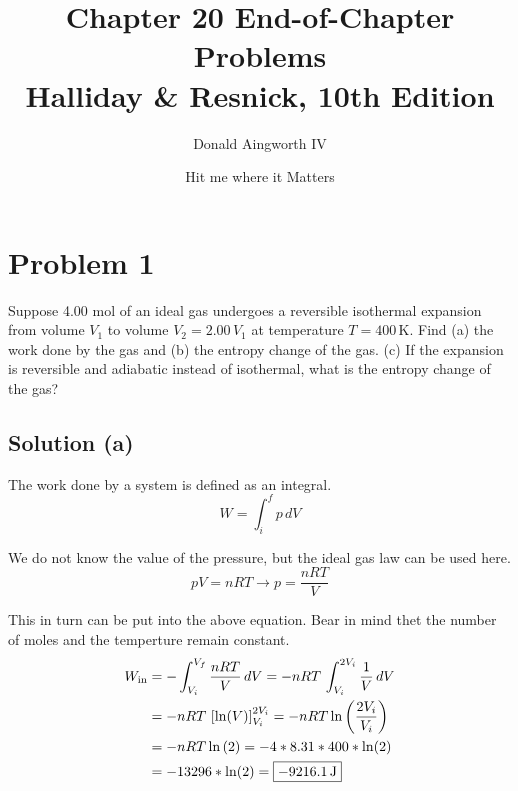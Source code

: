 \documentclass[12pt]{article}
\title{
    Chapter 20 End-of-Chapter Problems
    \\ \small
    Halliday \& Resnick, 10th Edition
}
\author{Donald Aingworth IV}
\date{\small Hit me where it Matters}
\begin{document}

    \maketitle

    \pagebreak
    \section{Problem 1}
        Suppose 4.00 mol of an ideal gas undergoes a reversible isothermal expansion from volume $V_1$ to volume $V_2 = 2.00\,V_1$ at temperature $T = 400\,\unit{\kelvin}$. 
        Find (a) the work done by the gas and (b) the entropy change of the gas. 
        (c) If the expansion is reversible and adiabatic instead of isothermal, what is the entropy change of the gas?

        \subsection{Solution (a)}
            The work done by a system is defined as an integral.
            \begin{equation}
                W   =   \int_{i}^{f} p\,dV
            \end{equation}

            We do not know the value of the pressure, but the ideal gas law can be used here.
            \begin{equation}
                pV = nRT \to p = \frac{nRT}{V}
            \end{equation}

            This in turn can be put into the above equation.
            Bear in mind thet the number of moles and the temperture remain constant.
            \begin{align}
                W_{\rm in}  &=  -\int_{V_i}^{V_f} \frac{nRT}{V}\,dV
                    =   -nRT\,\int_{V_i}^{2V_i} \frac{1}{V}\,dV\\
                    &=  -nRT\,\left[ \ln(V) \right]_{V_i}^{2V_i}
                    =   -nRT\ln\left( \frac{2V_i}{V_i} \right)\\
                    &=  -nRT\ln\left( 2 \right)
                    =   -4*8.31*400*\ln(2)\\
                    &=  -13296*\ln(2)
                    =   \boxed{-9216.1\,\unit{\joule}}
            \end{align}
\end{document}
